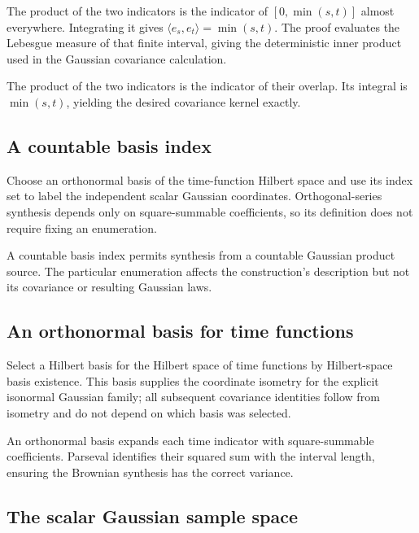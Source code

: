 \documentclass[11pt,a4paper]{report}
\begin{document}
The product of the two indicators is the indicator of \([0,\min(s,t)]\) almost everywhere. Integrating it gives \(\langle e_s,e_t\rangle=\min(s,t)\). The proof evaluates the Lebesgue measure of that finite interval, giving the deterministic inner product used in the Gaussian covariance calculation.



The product of the two indicators is the indicator of their overlap. Its integral is \(\min(s,t)\), yielding the desired covariance kernel exactly.

\subsection{\texorpdfstring{A countable basis index}{A countable basis index}}
\label{report-step-UnadjustedLangevin-CanonicalBrownian-lean-4}


Choose an orthonormal basis of the time-function Hilbert space and use its index set to label the independent scalar Gaussian coordinates. Orthogonal-series synthesis depends only on square-summable coefficients, so its definition does not require fixing an enumeration.



A countable basis index permits synthesis from a countable Gaussian product source. The particular enumeration affects the construction's description but not its covariance or resulting Gaussian laws.

\subsection{\texorpdfstring{An orthonormal basis for time functions}{An orthonormal basis for time functions}}
\label{report-step-UnadjustedLangevin-CanonicalBrownian-lean-5}


Select a Hilbert basis for the Hilbert space of time functions by Hilbert-space basis existence. This basis supplies the coordinate isometry for the explicit isonormal Gaussian family; all subsequent covariance identities follow from isometry and do not depend on which basis was selected.



An orthonormal basis expands each time indicator with square-summable coefficients. Parseval identifies their squared sum with the interval length, ensuring the Brownian synthesis has the correct variance.

\subsection{\texorpdfstring{The scalar Gaussian sample space}{The scalar Gaussian sample space}}
\label{report-step-UnadjustedLangevin-CanonicalBrownian-lean-6}
\end{document}
